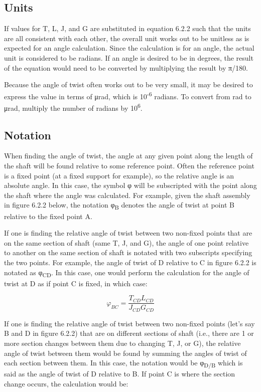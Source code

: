 \documentclass[
  letterpaper,
  DIV=11,
  numbers=noendperiod]{scrreprt}
\begin{document}
\subsection{Units}\label{units}

If values for T, L, J, and G are substituted in equation 6.2.2 such that
the units are all consistent with each other, the overall unit works out
to be unitless as is expected for an angle calculation. Since the
calculation is for an angle, the actual unit is considered to be
radians. If an angle is desired to be in degrees, the result of the
equation would need to be converted by multiplying the result by π/180.

Because the angle of twist often works out to be very small, it may be
desired to express the value in terms of μrad, which is
10\textsuperscript{-6} radians. To convert from rad to μrad, multiply
the number of radians by 10\textsuperscript{6}.

\subsection{Notation}\label{notation}

When finding the angle of twist, the angle at any given point along the
length of the shaft will be found relative to some reference point.
Often the reference point is a fixed point (at a fixed support for
example), so the relative angle is an absolute angle. In this case, the
symbol φ will be subscripted with the point along the shaft where the
angle was calculated. For example, given the shaft assembly in figure
6.2.2 below, the notation φ\textsubscript{B} denotes the angle of twist
at point B relative to the fixed point A.

If one is finding the relative angle of twist between two non-fixed
points that are on the same section of shaft (same T, J, and G), the
angle of one point relative to another on the same section of shaft is
notated with two subscripts specifying the two points. For example, the
angle of twist of D relative to C in figure 6.2.2 is notated as
φ\textsubscript{CD}. In this case, one would perform the calculation for
the angle of twist at D as if point C is fixed, in which case:

\[
\varphi_{B C}=\frac{T_{C D} L_{C D}}{J_{C D} G_{C D}}
\]

If one is finding the relative angle of twist between two non-fixed
points (let's say B and D in figure 6.2.2) that are on different
sections of shaft (i.e., there are 1 or more section changes between
them due to changing T, J, or G), the relative angle of twist between
them would be found by summing the angles of twist of each section
between them. In this case, the notation would be φ\textsubscript{D/B}
which is said as the angle of twist of D relative to B. If point C is
where the section change occurs, the calculation would be:
\end{document}
